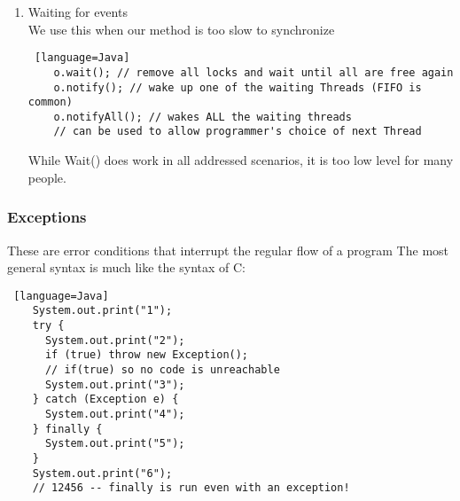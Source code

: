 \documentclass[../../lecture_notes.tex]{subfiles}
\begin{document}
\begin{enumerate} [itemsep=0mm]
		Effectively places a lock on the object → methods must be VERY fast.\\
		This fixes many errors that volatile doesn’t.
		\begin{lstlisting} [language=Java]		
	class C
	{
	  volatile int x, y;
	  synchronized void set(int newx)
	  {
	    if (newx < newx + 1)
	    {
	      x = newx; y = newx + 1;
	    }
	  }
	  int getx() {return x;}
	  int gety() {return y;}
	  synchronized long getBoth () {return ((long) x << 32) + y;}
	}
	long ab = getBoth();
	long a = ab >> 32;
	long b = ab & 0xFFFFFFFF;
	if (a >= b) disaster_strikes();
	\end{lstlisting}
\item Waiting for events\\
	We use this when our method is too slow to synchronize
	\begin{lstlisting} [language=Java]
	o.wait(); // remove all locks and wait until all are free again
	o.notify(); // wake up one of the waiting Threads (FIFO is common)
	o.notifyAll(); // wakes ALL the waiting threads 
	// can be used to allow programmer's choice of next Thread
		\end{lstlisting}
		While Wait() does work in all addressed scenarios, it is too low level for many people.\\
\end{enumerate}

\subsubsection*{Exceptions}
These are error conditions that interrupt the regular flow of a program
The most general syntax is much like the syntax of C:
\begin{lstlisting} [language=Java]
	System.out.print("1"); 
	try {
	  System.out.print("2");
	  if (true) throw new Exception(); 
	  // if(true) so no code is unreachable
	  System.out.print("3");
	} catch (Exception e) {
	  System.out.print("4");
	} finally {
	  System.out.print("5");
	}
	System.out.print("6");
	// 12456 -- finally is run even with an exception!
 \end{lstlisting} \medskip
 
\end{document}
